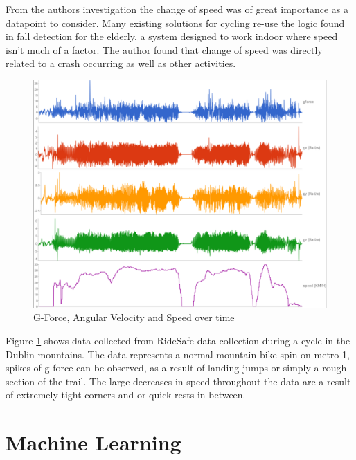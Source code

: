 From the authors investigation the change of speed was of great importance as a datapoint to consider. Many existing solutions for cycling re-use the logic found in fall detection for the elderly, a system designed to work indoor where speed isn't much of a factor. The author found that change of speed was directly related to a crash occurring as well as other activities. 

\vspace{2cm}
\begin{figure}[h]
	\centering
	\includegraphics[scale = .7] {design/sampledata.png}
	\caption{G-Force, Angular Velocity and Speed  over time}
	\label{sampledata}
\end{figure}
\vspace{1cm}

Figure \ref{sampledata} shows data collected from RideSafe data collection during a cycle in the Dublin mountains. The data represents a normal mountain bike spin on metro 1, spikes of g-force can be observed, as a result of landing jumps or simply a rough section of the trail. The large decreases in speed throughout the data are a result of extremely tight corners and or quick rests in between.

\newpage

\section{Machine Learning}



